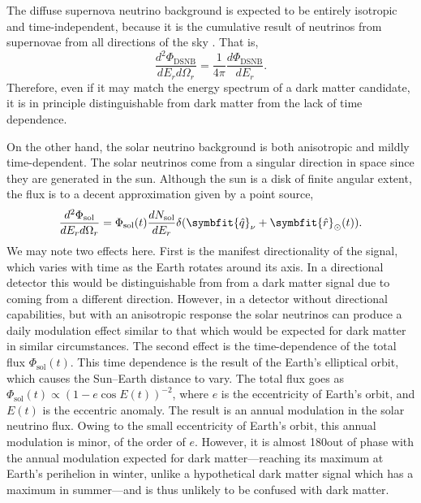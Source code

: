 \documentclass[b5paper, 10pt, twoside]{book}
\newcommand{\der}[2]{\frac{d#1}{d#2}}
\newcommand{\ddder}[3]{\frac{d^2#1}{d#2d#3}}
\newcommand{\unitv}[1]{\symbfit{\hat{#1}}}
\begin{document}
The diffuse supernova neutrino background is expected to be entirely isotropic and time-independent, because it is the cumulative result of neutrinos from supernovae from all directions of the sky \parencite{Beacom2010}. That is,
\begin{equation}
\ddder{\Phi_\text{DSNB}}{E_r}{\Omega_r}=\frac{1}{4\pi}\der{\Phi_\text{DSNB}}{E_r}.
\end{equation}
Therefore, even if it may match the energy spectrum of a dark matter candidate, it is in principle distinguishable from dark matter from the lack of time dependence. 

On the other hand, the solar neutrino background is both anisotropic and mildly time-dependent. The solar neutrinos come from a singular direction in space since they are generated in the sun. Although the sun is a disk of finite angular extent, the flux is to a decent approximation given by a point source,
\begin{equation}
\ddder{\Phi_\text{sol}}{E_r}{\Omega_r}=\Phi_\text{sol}(t)\der{N_\text{sol}}{E_r}\delta(\unitv{q}_\nu+\unitv{r}_\odot(t)).
\end{equation}
We may note two effects here. First is the manifest directionality of the signal, which varies with time as the Earth rotates around its axis. In a directional detector this would be distinguishable from from a dark matter signal due to coming from a different direction. However, in a detector without directional capabilities, but with an anisotropic response the solar neutrinos can produce a daily modulation effect similar to that which would be expected for dark matter in similar circumstances. The second effect is the time-dependence of the total flux $\Phi_\text{sol}(t)$. This time dependence is the result of the Earth's elliptical orbit, which causes the Sun--Earth distance to vary. The total flux goes as $\Phi_\text{sol}(t)\propto(1-e\cos E(t))^{-2}$, where $e$ is the eccentricity of Earth's orbit, and $E(t)$ is the eccentric anomaly. The result is an annual modulation in the solar neutrino flux. Owing to the small eccentricity of Earth's orbit, this annual modulation is minor, of the order of $e$. However, it is almost 180\degree out of phase with the annual modulation expected for dark matter---reaching its maximum at Earth's perihelion in winter, unlike a hypothetical dark matter signal which has a maximum in summer---and is thus unlikely to be confused with dark matter. 
\end{document}
